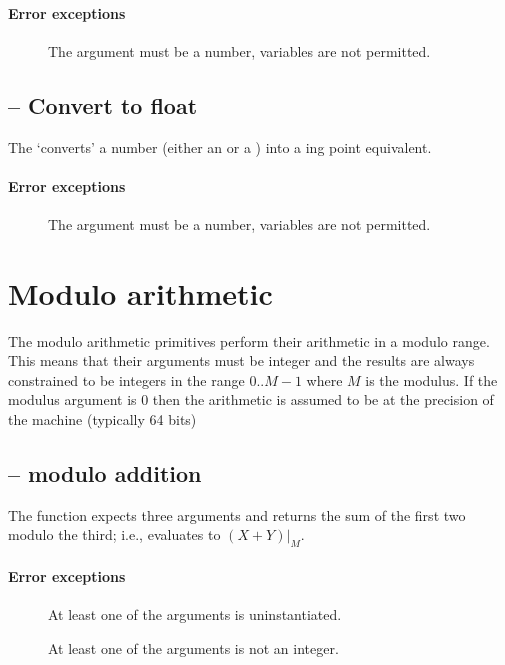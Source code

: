 \paragraph{Error exceptions}
\begin{description}
\item[]
The argument must be a number, variables are not permitted.
\end{description}

\subsection{ -- Convert to float}
\label{arith:n2float}
The  `converts' a number (either an  or a ) into a ing point equivalent.

\paragraph{Error exceptions}
\begin{description}
\item[]
The argument must be a number, variables are not permitted.
\end{description}


\section{Modulo arithmetic}
\label{arith:modulo}

The modulo arithmetic primitives perform their arithmetic in a modulo range. This means that their arguments must be integer and the results are always constrained to be integers in the range $0..M-1$ where $M$ is the modulus. If the modulus argument is 0 then the arithmetic is assumed to be at the precision of the machine (typically 64 bits)

\subsection{ -- modulo addition}
The  function expects three  arguments and returns the sum of the first two modulo the third; i.e.,  evaluates to $(X+Y)|_M$.
        
\paragraph{Error exceptions}
\begin{description}
\item[]
At least one of the arguments is uninstantiated.
\item[]
At least one of the arguments is not an integer.
\end{description}

